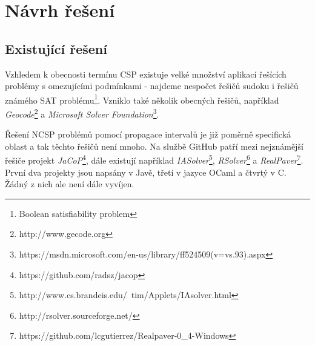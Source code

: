 \chapter{Návrh řešení}
\section{Existující řešení}
Vzhledem k obecnosti termínu CSP existuje velké množství aplikací řešících problémy s omezujícími podmínkami - najdeme nespočet řešičů sudoku i řešičů známého SAT problému\footnote{Boolean satisfiability problem}. Vzniklo také několik obecných řešičů, například \emph{Geocode}\footnote{http://www.gecode.org} a \emph{Microsoft Solver Foundation}\footnote{https://msdn.microsoft.com/en-us/library/ff524509(v=vs.93).aspx}.

Řešení NCSP problémů pomocí propagace intervalů je již poměrně specifická oblast a tak těchto řešičů není mnoho. Na službě GitHub patří mezi nejznámější řešiče projekt \emph{JaCoP}\footnote{https://github.com/radsz/jacop}, dále existují například \emph{IASolver}\footnote{http://www.cs.brandeis.edu/~tim/Applets/IAsolver.html}, \emph{RSolver}\footnote{http://rsolver.sourceforge.net/} a \emph{RealPaver}\footnote{https://github.com/lcgutierrez/Realpaver-0\_4-Windows}. První dva projekty jsou napsány v Javě, třetí v jazyce OCaml a čtvrtý v C. Žádný z nich ale není dále vyvíjen.
